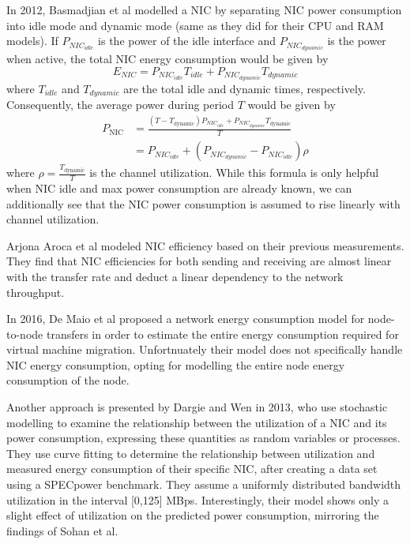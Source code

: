 In 2012, Basmadjian et al\parencite{basmadjianCloudComputingIts2012} modelled a NIC by separating NIC power consumption into idle mode and dynamic mode (same as they did for their CPU and RAM models). If $P_{NIC_{idle}}$ is the power of the idle interface and $P_{NIC_{dynamic}}$ is the power when active, the total NIC energy consumption would be given by
\begin{equation}
    E_{NIC} = P_{NIC_{idle}}T_{idle} + P_{NIC_{dynamic}}T_{dynamic}
\end{equation}
where $T_{idle}$ and $T_{dynamic}$ are the total idle and dynamic times, respectively. Consequently, the average power during period $T$ would be given by
\begin{align}
    P_{\text{NIC}} &= \frac{(T - T_{\text{dynamic}}) P_{NIC_{idle}} + P_{NIC_{dynamic}} T_{\text{dynamic}}}{T}\\
                   &= P_{NIC_{idle}} + (P_{NIC_{dynamic}} - P_{NIC_{idle}})\rho
\end{align}
where $\rho=\frac{T_{\text{dynamic}}}{T}$ is the channel utilization. While this formula is only helpful when NIC idle and max power consumption are already known, we can additionally see that the NIC power consumption is assumed to rise linearly with channel utilization.

Arjona Aroca et al\parencite{arjonaarocaMeasurementbasedAnalysisEnergy2014} modeled NIC efficiency based on their previous measurements. They find that NIC efficiencies for both sending and receiving are almost linear with the transfer rate and deduct a linear dependency to the network throughput.

In 2016, De Maio et al\parencite{demaioModellingEnergyConsumption2016} proposed a network energy consumption model for node-to-node transfers in order to estimate the entire energy consumption required for virtual machine migration. Unfortnuately their model does not specifically handle NIC energy consumption, opting for modelling the entire node energy consumption of the node.

Another approach is presented by Dargie and Wen\parencite{dargieProbabilisticModelEstimating2013} in 2013, who use stochastic modelling to examine the relationship between the utilization of a NIC and its power consumption, expressing these quantities as random variables or processes. They use curve fitting to determine the relationship between utilization and measured energy consumption of their specific NIC, after creating a data set using a SPECpower benchmark. They assume a uniformly distributed bandwidth utilization in the interval [0,125] MBps. Interestingly, their model shows only a slight effect of utilization on the predicted power consumption, mirroring the findings of Sohan et al.

